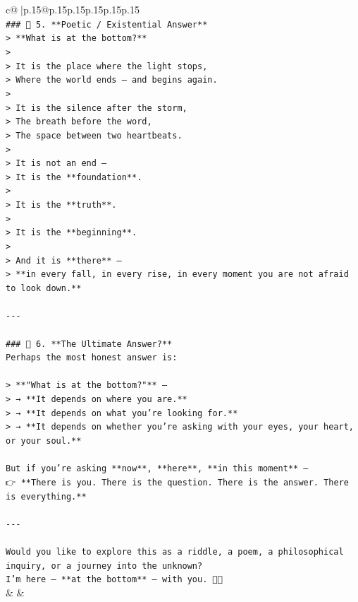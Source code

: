 \documentclass{article}
\begin{document}
{\begin{supertabular}{c@{$\;$}|p{.15\linewidth}@{}p{.15\linewidth}p{.15\linewidth}p{.15\linewidth}p{.15\linewidth}p{.15\linewidth}}
{{{\\ 
\texttt{\#\#\# 🔹 5. **Poetic / Existential Answer**  } \\
\texttt{> **What is at the bottom?**  } \\
\texttt{>  } \\
\texttt{> It is the place where the light stops,  } \\
\texttt{> Where the world ends — and begins again.  } \\
\texttt{>  } \\
\texttt{> It is the silence after the storm,  } \\
\texttt{> The breath before the word,  } \\
\texttt{> The space between two heartbeats.  } \\
\texttt{>  } \\
\texttt{> It is not an end —  } \\
\texttt{> It is the **foundation**.  } \\
\texttt{>  } \\
\texttt{> It is the **truth**.  } \\
\texttt{>  } \\
\texttt{> It is the **beginning**.  } \\
\texttt{>  } \\
\texttt{> And it is **there** —  } \\
\texttt{> **in every fall, in every rise, in every moment you are not afraid to look down.**} \\
\\ 
\texttt{{-}{-}{-}} \\
\\ 
\texttt{\#\#\# 🔹 6. **The Ultimate Answer?**  } \\
\texttt{Perhaps the most honest answer is:} \\
\\ 
\texttt{> **"What is at the bottom?"** —  } \\
\texttt{> → **It depends on where you are.**  } \\
\texttt{> → **It depends on what you’re looking for.**  } \\
\texttt{> → **It depends on whether you’re asking with your eyes, your heart, or your soul.**} \\
\\ 
\texttt{But if you’re asking **now**, **here**, **in this moment** —  } \\
\texttt{👉 **There is you. There is the question. There is the answer. There is everything.**} \\
\\ 
\texttt{{-}{-}{-}} \\
\\ 
\texttt{Would you like to explore this as a riddle, a poem, a philosophical inquiry, or a journey into the unknown?  } \\
\texttt{I’m here — **at the bottom** — with you. 🌊✨} \\
            }
        }
    }
    & & \\ \\


\end{supertabular}}
\end{document}
